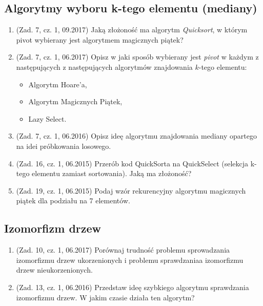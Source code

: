 \documentclass[10pt]{article}%
\begin{document}
\subsection{Algorytmy wyboru k-tego elementu (mediany)}

\begin{enumerate}

\item (Zad. 7, cz. 1, 09.2017) Jaką złożoność ma algorytm \textit{Quicksort}, w którym pivot wybierany jest algorytmem magicznych piątek?

\item (Zad. 7, cz. 1, 06.2017) Opisz w jaki sposób wybierany jest \emph{pivot} w każdym z następujących z następujących algorytmów znajdowania $k$-tego elementu: 
\begin{itemize}
	\item Algorytm Hoare'a,
	\item Algorytm Magicznych Piątek,
	\item Lazy Select.
\end{itemize}

\item (Zad. 7, cz. 1, 06.2016) Opisz ideę algorytmu znajdowania mediany opartego na idei próbkowania losowego.

\item (Zad. 16, cz. 1, 06.2015) Przerób kod QuickSorta na QuickSelect (selekcja k-tego elementu zamiast sortowania). Jaką ma złożoność?

\item (Zad. 19, cz. 1, 06.2015) Podaj wzór rekurencyjny algorytmu magicznych piątek dla podziału na 7 elementów. 

\end{enumerate}


\subsection{Izomorfizm drzew}

\begin{enumerate}

\item (Zad. 10, cz. 1, 06.2017) Porównaj trudność problemu sprowadzania izomorfizmu drzew ukorzenionych i problemu sprawdzaniaa izomorfizmu drzew nieukorzenionych.

\item (Zad. 13, cz. 1, 06.2016) Przedstaw ideę szybkiego algorytmu sprawdzania izomorfizmu drzew. W jakim czasie działa ten algorytm?

\end{enumerate}
\end{document}
